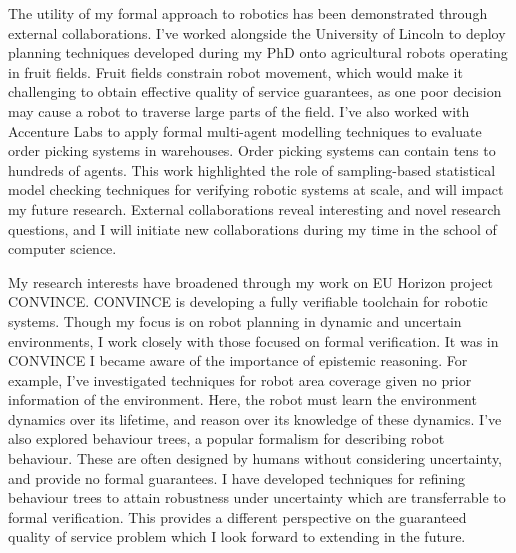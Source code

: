 \documentclass[12pt]{article}
\begin{document}

The utility of my formal approach to robotics has been demonstrated through external collaborations.
%
I've worked alongside the University of Lincoln to deploy planning techniques developed during my PhD onto agricultural robots operating in fruit fields.
%
Fruit fields constrain robot movement, which would make it challenging to obtain effective quality of service guarantees, as one poor decision may cause a robot to traverse large parts of the field.
%
I've also worked with Accenture Labs to apply formal multi-agent modelling techniques to evaluate order picking systems in warehouses.
%
Order picking systems can contain tens to hundreds of agents.
%
This work highlighted the role of sampling-based statistical model checking techniques for verifying robotic systems at scale, and will impact my future research.
%
%
%
External collaborations reveal interesting and novel research questions, and I will initiate new collaborations during my time in the school of computer science.



My research interests have broadened through my work on EU Horizon project CONVINCE.
%
CONVINCE is developing a fully verifiable toolchain for robotic systems.
%
Though my focus is on robot planning in dynamic and uncertain environments, I work closely with those focused on formal verification.
%
It was in CONVINCE I became aware of the importance of epistemic reasoning.
%
For example, I've investigated techniques for robot area coverage given no prior information of the environment.
%
Here, the robot must learn the environment dynamics over its lifetime, and reason over its knowledge of these dynamics.
%
I've also explored behaviour trees, a popular formalism for describing robot behaviour.
%
These are often designed by humans without considering uncertainty, and provide no formal guarantees.
%
I have developed techniques for refining behaviour trees to attain robustness under uncertainty which are transferrable to formal verification.
%
This provides a different perspective on the guaranteed quality of service problem which I look forward to extending in the future.
\end{document}
